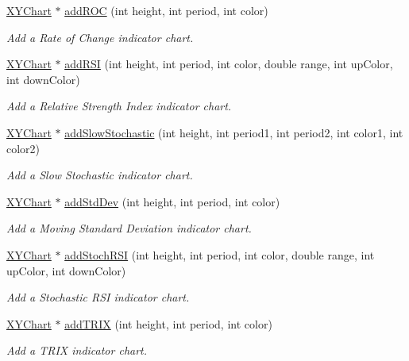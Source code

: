 \begin{DoxyCompactItemize}
\hyperlink{class_x_y_chart}{X\+Y\+Chart} $\ast$ \hyperlink{class_finance_chart_ac8ca50e0764d729d0591d1baace193de}{add\+R\+OC} (int height, int period, int color)
\begin{DoxyCompactList}\small\item\em Add a Rate of Change indicator chart. \end{DoxyCompactList}\item 
\hyperlink{class_x_y_chart}{X\+Y\+Chart} $\ast$ \hyperlink{class_finance_chart_aba175ac4bc80577bad0767bcd75109c7}{add\+R\+SI} (int height, int period, int color, double range, int up\+Color, int down\+Color)
\begin{DoxyCompactList}\small\item\em Add a Relative Strength Index indicator chart. \end{DoxyCompactList}\item 
\hyperlink{class_x_y_chart}{X\+Y\+Chart} $\ast$ \hyperlink{class_finance_chart_a2f1d675f9a5e8f280b4f16d3a36eb204}{add\+Slow\+Stochastic} (int height, int period1, int period2, int color1, int color2)
\begin{DoxyCompactList}\small\item\em Add a Slow Stochastic indicator chart. \end{DoxyCompactList}\item 
\hyperlink{class_x_y_chart}{X\+Y\+Chart} $\ast$ \hyperlink{class_finance_chart_abee75e01f567badfa4da74c92a60d00c}{add\+Std\+Dev} (int height, int period, int color)
\begin{DoxyCompactList}\small\item\em Add a Moving Standard Deviation indicator chart. \end{DoxyCompactList}\item 
\hyperlink{class_x_y_chart}{X\+Y\+Chart} $\ast$ \hyperlink{class_finance_chart_a8c44b07a3a6dcf2e3feb09960dfa9770}{add\+Stoch\+R\+SI} (int height, int period, int color, double range, int up\+Color, int down\+Color)
\begin{DoxyCompactList}\small\item\em Add a Stochastic R\+SI indicator chart. \end{DoxyCompactList}\item 
\hyperlink{class_x_y_chart}{X\+Y\+Chart} $\ast$ \hyperlink{class_finance_chart_a54ec3c32375abf620ca16208f24717ce}{add\+T\+R\+IX} (int height, int period, int color)
\begin{DoxyCompactList}\small\item\em Add a T\+R\+IX indicator chart. \end{DoxyCompactList}\item 

\end{DoxyCompactItemize}
